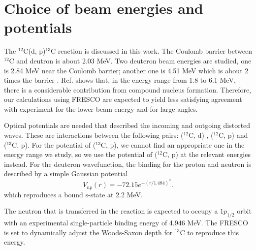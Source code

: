 \section{Choice of beam energies and potentials} \label{part1}
	The $^{12}$C(d, p)$^{13}$C reaction is discussed in this work. 
	The Coulomb barrier between $^{12}$C and deutron is about 2.03 MeV.
	Two deuteron beam energies are studied, one is 2.84 MeV near the Coulomb barrier; another one is 4.51 MeV which is about 2 times the barrier .
	Ref. \cite{PhysRev.101.209} shows that, in the energy range from 1.8 to 6.1 MeV, there is a considerable contribution from compound nucleus formation. 
	Therefore, our calculations using FRESCO are expected to yield less satisfying agreement with experiment for the lower beam energy and for large angles.
	
	Optical potentials are needed that described the incoming and outgoing distorted waves.  
	These are interactions between the following pairs: ($^{12}$C, d) \cite{PhysRevC.73.054605}, ($^{12}$C, p) \cite{PTCOG} and ($^{13}$C, p). 
	For the potential of ($^{13}$C, p), we cannot find an appropriate one in the energy range we study, 
	so we use the potential of ($^{12}$C, p) at the relevant energies instead. 
	For the deuteron wavefunction, the binding for the proton and neutron is described by a simple Gaussian potential 
	\begin{equation}
		V_{np}(r)=-72.15e^{-(r/1.484)^2}.
	\end{equation}
	which reproduces a bound s-state at 2.2 MeV.
	
	The neutron that is transferred in the reaction is expected to occupy a $1p_{1/2}$ orbit with an experimental single-particle binding energy of 4.946 MeV. 
	The FRESCO is set to dynamically adjust the Woods-Saxon depth for $^{13}$C to reproduce this energy.
	
	